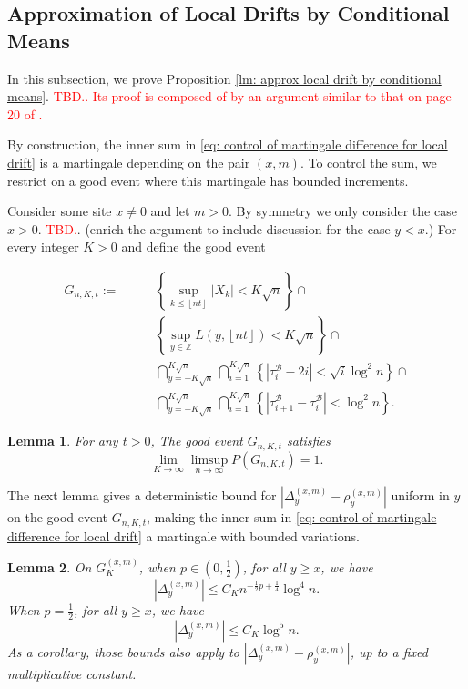\documentclass[twoside,12pt,a4paper]{article}
\newtheorem{lemma}{Lemma}[section]
\numberwithin{equation}{section}
\newcommand\TBD{\textcolor{red}{TBD.}}
\begin{document}
\subsection{Approximation of Local Drifts by Conditional Means}
In this subsection, we prove Proposition \ref{lm: approx local drift by conditional means}. \textcolor{red}{\TBD. Its proof is composed of by an argument similar to that on page 20 of \cite{KP16}.}

By construction, the inner sum in \eqref{eq: control of martingale difference for local drift} is a martingale depending on the pair  $(x,m)$. To control the sum, we restrict on a good event where this martingale has bounded increments. 

Consider some site $x \neq 0$ and let $m > 0$. By symmetry we only consider the case $x >  0$. \TBD. (enrich the argument to include discussion for the case $y < x$.) 
For every integer $K>0$ and define the good event

\begin{align}
	G_{n,K,t} :=  \qquad
		\label{eqn:good-event-1}
		& \left\{\sup _{k \le \left\lfloor nt  \right\rfloor} |X_k| < K \sqrt{n} \right\} \cap \\
		\label{eqn:good-event-2}
		& \left\{\sup_{y \in \mathbb{Z}} L(y, \left\lfloor nt  \right\rfloor) < K \sqrt{n} \right\} \cap \\
		\label{eqn:good-event-3}
		& \bigcap_{y = - K \sqrt{n} }^{K \sqrt{n}} 
		\bigcap_{i = 1}^{K \sqrt{n} } \left\{\left| \tau_i^{\mathcal{B}} - 2 i \right| < \sqrt{ i } \log^2 n \right\}  \cap \\
		\label{eqn:good-event-4}
		& \bigcap_{y = - K \sqrt{n} }^{K \sqrt{n}} 
		\bigcap_{i = 1}^{K \sqrt{n} } \left\{\left| \tau_{i+1}^{\mathcal{B}} - \tau_i^{\mathcal{B}} \right| < \log^2 n \right\}  
.\end{align}

\begin{lemma}
	\label{lem:good-event}
	For any $t > 0$, The good event $G_{n,K,t}$ satisfies
	\[
		\lim_{K \to \infty } \limsup_{n \to \infty } 
		P(G_{n, K,t}) = 1
	.\] 
\end{lemma}


The next lemma gives a deterministic bound for $|\Delta_y^{(x,m)} - \rho_y^{(x,m)}|$ uniform in $y$ on the good event $G_{n,K,t}$, making the inner sum in \eqref{eq: control of martingale difference for local drift} a martingale with bounded variations.

\begin{lemma}\label{lm:lipchitz-bound-on-good-event}
	On $G_{K}^{(x,m)}$, when $p \in (0,\frac{1}{2})$, for all  $y \ge x$, we have
	\[
		\left| \Delta_y^{(x,m)} \right| \le C_K n^{-\frac{1}{2}p + \frac{1}{4}} \log^4 n
	.\] 
	When $p = \frac{1}{2}$, for all $y \ge x$, we have
\[
		\left| \Delta_y^{(x,m)} \right| \le C_K \log^5 n
	.\]
	As a corollary, those bounds also apply to $\left| \Delta_y^{(x,m)} - \rho_y^{(x,m)} \right| $, up to a fixed multiplicative constant.
\end{lemma}
\end{document}
